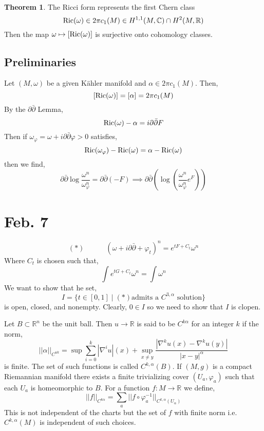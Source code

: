 \documentclass[12pt]{extarticle}
\newcommand{\R}{\mathbb{R}}
\newcommand{\C}{\mathbb{C}}
\theoremstyle{definition}
\newtheorem{theorem}{Theorem}[section]
\newenvironment{definition}[1][Definition:]{\begin{trivlist}
\item[\hskip \labelsep {\bfseries #1}]}{\end{trivlist}}
\begin{document}
\begin{theorem}
The Ricci form represents the first Chern class 
\[ \Ric(\omega) \in 2 \pi c_1(M) \in H^{1,1}(M, \C) \cap H^2(M, \R)\]
Then the map $\omega \mapsto [\mathrm{Ric}(\omega)]$ is surjective onto cohomology classes. 
\end{theorem}

\subsection{Preliminaries}

Let $(M, \omega)$ be a given K\"{a}hler manifold and $\alpha \in 2 \pi c_1(M)$. Then, 
\[ [\mathrm{Ric}(\omega)] = [\alpha] = 2\pi c_1(M)\]
By the $\partial \bar{\partial}$ Lemma,
\[ \mathrm{Ric}(\omega) - \alpha = i \partial \bar{\partial} F \]
Then if $\omega_\varphi = \omega + i \partial \bar{\partial} \varphi > 0$ satisfies,
\[ \mathrm{Ric}(\omega_\varphi) - \mathrm{Ric}(\omega) = \alpha - \mathrm{Ric}(\omega) \]
then we find,
\[ \partial \bar{\partial} \log{ \frac{\omega^n}{\omega_\varphi^n}} = \partial \bar{\partial} (- F) \implies \partial \bar{\partial} \left( \log{\left( \frac{\omega^n}{\omega_\varphi^n} e^F \right)} \right) \] 


\section{Feb. 7}

\[ (*) \quad \quad \quad (\omega + i \partial \bar{\partial} + \varphi_t)^n = e^{t F + C_t} \omega^n \]
Where $C_t$ is chosen such that,
\[ \int e^{t G + C_t} \omega^n = \int \omega^n \]
We want to show that he set,
\[ I = \{ t \in [0, 1] \mid (*) \text{admits a $C^{3, \alpha}$ solution} \} \]
is open, closed, and nonempty. Clearly, $0 \in I$ so we need to show that $I$ is clopen. 

\newcommand{\norm}[3]{||#3||_{C^{#1 #2}}}

\begin{definition}
Let $B \subset \R^n$ be the unit ball. Then $u \to \R$ is said to be $C^{k \alpha}$ for an integer $k$ if the norm,
\[ \norm{u}{k}{\alpha} = \sup \sum_{i = 0}^k |\nabla^i u|(x) + \sup_{x \neq y} \frac{|\nabla^k u(x) - \nabla^k u(y)|}{|x - y|^\alpha} \]
is finite. The set of such functions is called $C^{k, \alpha}(B)$. If $(M, g)$ is a compact Riemannian manifold there exists a finite trivializing cover $(U_a, \varphi_a)$ such that each $U_a$ is homeomorphic to $B$. For a function $f : M \to \R$ we define,
\[ \norm{k}{\alpha}{f} = \sum_a || f \circ \varphi^{-1}_a||_{C^{k, \alpha}(U_\alpha)} \] 
This is not independent of the charts but the set of $f$ with finite norm i.e. $C^{k, \alpha}(M)$ is independent of such choices.   
\end{definition}
\end{document}
